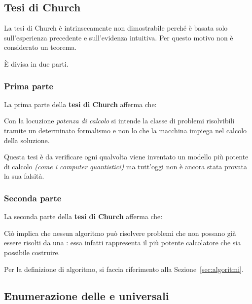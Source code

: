 \documentclass[italian, 10pt]{article}
\begin{document}
\subsection{Tesi di Church}
\label{sec:tesi-di-church}

La tesi di Church è intrinsecamente non dimostrabile perché è basata solo sull'esperienza precedente e sull'evidenza intuitiva.
Per questo motivo non è considerato un teorema.

È divisa in due parti.

\subsubsection{Prima parte}
La prima parte della \textbf{tesi di Church} afferma che:


Con la locuzione \textit{potenza di calcolo} si intende la classe di problemi risolvibili tramite un determinato formalismo e non lo  che la macchina impiega nel calcolo della soluzione.

Questa tesi è da verificare ogni qualvolta viene inventato un modello più potente di calcolo \textit{(come i computer quantistici)} ma tutt'oggi non è ancora stata provata la sua falsità.

\subsubsection{Seconda parte}

La seconda parte della \textbf{tesi di Church} afferma che:


Ciò implica che nessun algoritmo può risolvere problemi che non possano già essere risolti da una \TM: essa infatti rappresenta il più potente calcolatore che sia possibile costruire.

\bigskip
Per la definizione di algoritmo, si faccia riferimento alla Sezione~\ref{sec:algoritmi}.

\subsection{Enumerazione delle \TM e \TM universali}
\label{sec:enumerazione-TM-UTM}
\end{document}
